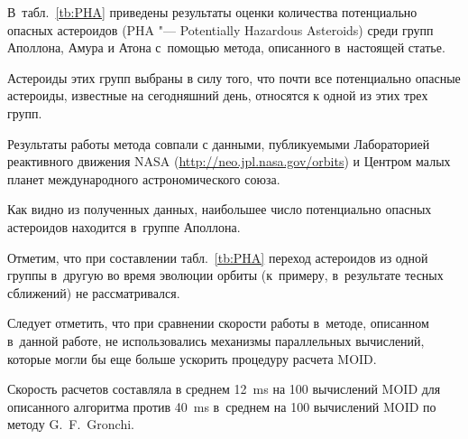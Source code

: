 В~табл.~\ref{tb:PHA} приведены результаты оценки количества потенциально опасных астероидов (PHA "--- Potentially Hazardous Asteroids) среди групп Аполлона, Амура и Атона с~помощью метода, описанного в~настоящей статье. 

Астероиды этих групп выбраны в силу того, что почти все потенциально опасные астероиды, известные на сегодняшний день, относятся к одной из этих трех групп. 

Результаты работы метода совпали с данными, публикуемыми Лабораторией реактивного движения NASA (\url{http://neo.jpl.nasa.gov/orbits}) и Центром малых планет международного астрономического союза. 

Как видно из полученных данных, наибольшее число потенциально опасных астероидов находится в~группе Аполлона. 

Отметим, что при составлении табл.~\ref{tb:PHA} переход астероидов из одной группы в~другую во время эволюции орбиты (к~примеру, в~результате тесных сближений) не рассматривался.



Следует отметить, что при сравнении скорости работы в~методе, описанном в~данной работе, не использовались механизмы параллельных вычислений, которые могли бы еще больше ускорить процедуру расчета MOID. 

Скорость расчетов составляла в среднем 12~ms на 100 вычислений MOID для описанного алгоритма против 40~ms в~среднем на 100 вычислений MOID по методу G.~F.~Gronchi.



